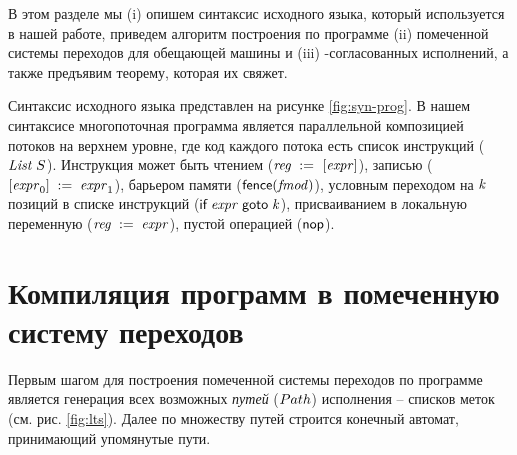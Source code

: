 В этом разделе мы (i) опишем синтаксис исходного языка, который используется в нашей работе,
приведем алгоритм построения по программе (ii) помеченной системы переходов для обещающей машины
и (iii) \ARM-согласованных исполнений, а также предъявим теорему, которая их свяжет.

Синтаксис исходного языка представлен на рисунке \ref{fig:syn-prog}.
В нашем синтаксисе многопоточная программа является параллельной композицией потоков на верхнем уровне, где
код каждого потока есть список инструкций ($\mathit{List}\;{S}$).
Инструкция может быть чтением ($\mathit{reg} \;:=_{}\;[\mathit{expr}]$),
записью ($[\mathit{expr}_0]\;:=\;\mathit{expr}_1$),
барьером памяти ($\mathsf{fence}({\mathit{fmod}})$), 
условным переходом на $\mathit{k}$ позиций в списке инструкций ($\textsf{if} \; \mathit{expr} \; \textsf{goto} \; \mathit{k}$),
присваиванием в локальную переменную ($\mathit{reg}\;:=\;\mathit{expr}$),
пустой операцией ($\textsf{nop}$).

\section{Компиляция программ в помеченную систему переходов}
Первым шагом для построения помеченной системы переходов по программе является
генерация всех возможных \emph{путей} ($Path$) исполнения -- списков меток (см. рис. \ref{fig:lts}).
Далее по множеству путей строится конечный автомат, принимающий упомянутые пути.

